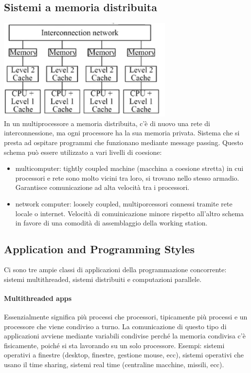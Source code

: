 \documentclass[10pt,a4paper]{article}
\begin{document}
\subsection{Sistemi a memoria distribuita}
\includegraphics[scale=1]{img/distrmem.png} \\
In un multiprocessore a memoria distribuita, c'è di nuovo una rete di interconnessione, ma ogni processore ha la sua memoria privata. Sistema che si presta ad ospitare programmi che funzionano mediante message passing. Questo schema può essere utilizzato a vari livelli di coesione: 
\begin{itemize}
\item multicomputer: tightly coupled machine (macchina a coesione stretta) in cui processori e rete sono molto vicini tra loro, si trovano nello stesso armadio. Garantisce comunicazione ad alta velocità tra i processori.
\item network computer: loosely coupled, multiporcessori connessi tramite rete locale o internet. Velocità di comuinicazione minore rispetto all'altro schema in favore di una comodità di assemblaggio della working station.
\end{itemize}

\subsection{Application and Programming Styles}
Ci sono tre ampie classi di applicazioni della programmazione concorrente: sistemi multithreaded, sistemi distribuiti e computazioni parallele.
\paragraph{Multithreaded apps} Essenzialmente significa più processi che processori, tipicamente più processi e un processore che viene condiviso a turno.
La comunicazione di questo tipo di applicazioni avviene mediante variabili condivise perché la memoria condivisa c'è fisicamente, poiché si sta lavorando su un solo processore.
Esempi: sistemi operativi a finestre (desktop, finestre, gestione mouse, ecc), sistemi operativi che usano il time sharing, sistemi real time (centraline macchine, missili, ecc).
\end{document}
